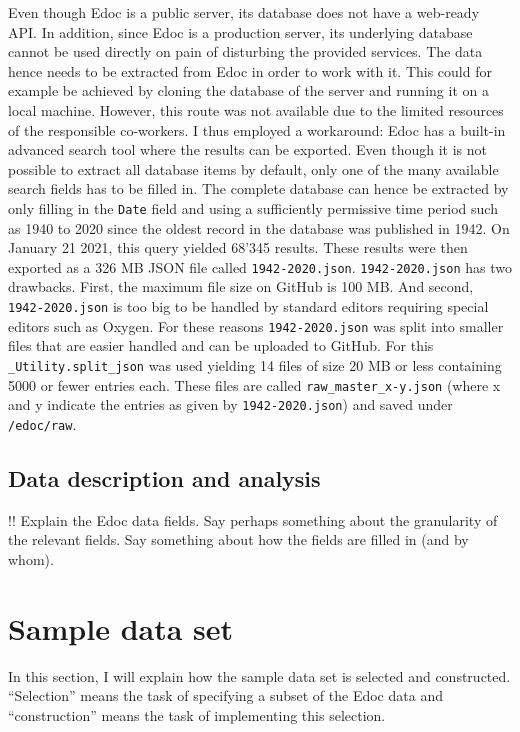 Even though Edoc is a public server, its database does not have a
web-ready API. In addition, since Edoc is a production server, its
underlying database cannot be used directly on pain of disturbing the
provided services. The data hence needs to be extracted from Edoc in
order to work with it. This could for example be achieved by cloning the
database of the server and running it on a local machine. However, this
route was not available due to the limited resources of the responsible
co-workers. I thus employed a workaround: Edoc has a built-in advanced
search tool where the results can be exported. Even though it is not
possible to extract all database items by default, only one of the many
available search fields has to be filled in. The complete database can
hence be extracted by only filling in the \texttt{Date} field and using
a sufficiently permissive time period such as 1940 to 2020 since the
oldest record in the database was published in 1942. On January 21 2021,
this query yielded 68'345 results. These results were then exported as a
326 MB JSON file called \texttt{1942-2020.json}. \texttt{1942-2020.json}
has two drawbacks. First, the maximum file size on GitHub is 100 MB. And
second, \texttt{1942-2020.json} is too big to be handled by standard
editors requiring special editors such as Oxygen. For these reasons
\texttt{1942-2020.json} was split into smaller files that are easier
handled and can be uploaded to GitHub. For this
\texttt{\_Utility.split\_json} was used yielding 14 files of size 20 MB
or less containing 5000 or fewer entries each. These files are called
\texttt{raw\_master\_x-y.json} (where x and y indicate the entries as
given by \texttt{1942-2020.json}) and saved under \texttt{/edoc/raw}.

\hypertarget{data-description-and-analysis}{%
\subsection{Data description and
analysis}\label{data-description-and-analysis}}

!! Explain the Edoc data fields. Say perhaps something about the
granularity of the relevant fields. Say something about how the fields
are filled in (and by whom).

\hypertarget{sample-data-set}{%
\section{Sample data set}\label{sample-data-set}}

In this section, I will explain how the sample data set is selected and
constructed. ``Selection'' means the task of specifying a subset of the
Edoc data and ``construction'' means the task of implementing this
selection.

